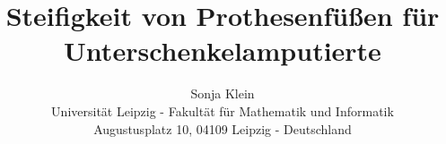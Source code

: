 \documentclass{SeminarV2}
\begin{document}
\title{Steifigkeit von Prothesenfüßen für Unterschenkelamputierte}

\author{Sonja Klein
%
\vspace{.3cm}\\
%
Universität Leipzig - Fakultät für Mathematik und Informatik \\
Augustusplatz 10, 04109 Leipzig - Deutschland
}

\maketitle







\end{document}
